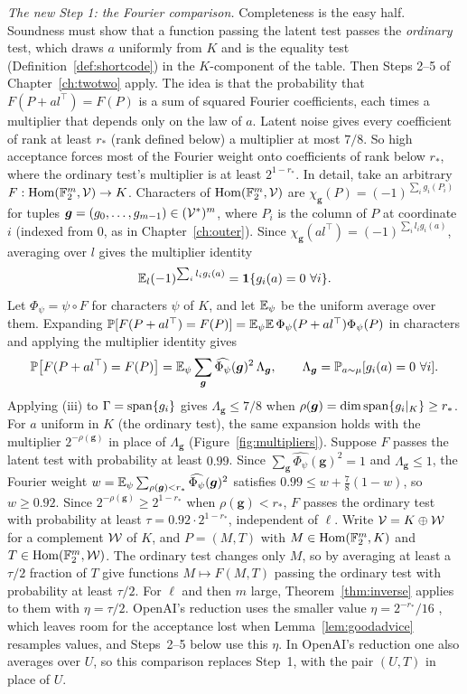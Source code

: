 \emph{The new Step 1: the Fourier comparison.}\label{nt:comparison} Completeness is the easy half. Soundness must show that a function passing the latent test passes the \emph{ordinary} test, which draws $a$ uniformly from $K$ and is the equality test (Definition~\ref{def:shortcode}) in the $K$-component of the table. Then Steps 2--5 of Chapter~\ref{ch:twotwo} apply. The idea is that the probability that $F(P+al^\top)=F(P)$ is a sum of squared Fourier coefficients, each times a multiplier that depends only on the law of $a$. Latent noise gives every coefficient of rank at least $r_*$ (rank defined below) a multiplier at most $7/8$. So high acceptance forces most of the Fourier weight onto coefficients of rank below $r_*$, where the ordinary test's multiplier is at least $2^{1-r_*}$. In detail, take an arbitrary $F:\operatorname{Hom}(\mathbb{F}_2^m,\mathcal{V})\to K$. Characters of $\operatorname{Hom}(\mathbb{F}_2^m,\mathcal{V})$ are $\chi_{\boldsymbol g}(P)=(-1)^{\sum_ig_i(P_i)}$ for tuples $\boldsymbol g=(g_0,\dots,g_{m-1})\in(\mathcal{V}^*)^m$, where $P_i$ is the column of $P$ at coordinate $i$ (indexed from $0$, as in Chapter~\ref{ch:outer}). Since $\chi_{\boldsymbol g}(al^\top)=(-1)^{\sum_il_ig_i(a)}$, averaging over $l$ gives the multiplier identity
\[
\E_l(-1)^{\sum_il_ig_i(a)}=\ind\{g_i(a)=0\ \forall i\}.
\]
Let $\Phi_\psi=\psi\circ F$ for characters $\psi$ of $K$, and let $\mathbb{E}_\psi$ be the uniform average over them. Expanding $\mathbb{P}[F(P+al^\top)=F(P)]=\mathbb{E}_\psi\mathbb{E}\,\Phi_\psi(P+al^\top)\Phi_\psi(P)$ in characters and applying the multiplier identity gives
\[
\mathbb{P}\bigl[F(P+al^\top)=F(P)\bigr]=\mathbb{E}_\psi\sum_{\boldsymbol g}\widehat{\Phi_\psi}(\boldsymbol g)^2\,\Lambda_{\boldsymbol g},\qquad \Lambda_{\boldsymbol g}=\mathbb{P}_{a\sim\mu}[g_i(a)=0\ \forall i].
\]
Applying (iii) to $\Gamma=\operatorname{span}\{g_i\}$ gives $\Lambda_{\boldsymbol g}\le7/8$ when $\rho(\boldsymbol g)=\dim\operatorname{span}\{g_i|_K\}\ge r_*$. For $a$ uniform in $K$ (the ordinary test), the same expansion holds with the multiplier $2^{-\rho(\boldsymbol g)}$ in place of $\Lambda_{\boldsymbol g}$ (Figure~\ref{fig:multipliers}). Suppose $F$ passes the latent test with probability at least $0.99$. Since $\sum_{\boldsymbol g}\widehat{\Phi_\psi}(\boldsymbol g)^2=1$ and $\Lambda_{\boldsymbol g}\le1$, the Fourier weight $w=\mathbb{E}_\psi\sum_{\rho(\boldsymbol g)<r_*}\widehat{\Phi_\psi}(\boldsymbol g)^2$ satisfies $0.99\le w+\tfrac78(1-w)$, so $w\ge0.92$. Since $2^{-\rho(\boldsymbol g)}\ge2^{1-r_*}$ when $\rho(\boldsymbol g)<r_*$, $F$ passes the ordinary test with probability at least $\tau=0.92\cdot2^{1-r_*}$, independent of $\ell$. Write $\mathcal{V}=K\oplus\mathcal{W}$ for a complement $\mathcal{W}$ of $K$, and $P=(M,T)$ with $M\in\operatorname{Hom}(\mathbb{F}_2^m,K)$ and $T\in\operatorname{Hom}(\mathbb{F}_2^m,\mathcal{W})$. The ordinary test changes only $M$, so by averaging at least a $\tau/2$ fraction of $T$ give functions $M\mapsto F(M,T)$ passing the ordinary test with probability at least $\tau/2$. For $\ell$ and then $m$ large, Theorem~\ref{thm:inverse} applies to them with $\eta=\tau/2$. OpenAI's reduction uses the smaller value $\eta=2^{-r_*}/16$ \cite[Equation~(5.4)]{OAI}, which leaves room for the acceptance lost when Lemma~\ref{lem:goodadvice} resamples values, and Steps~2--5 below use this $\eta$. In OpenAI's reduction one also averages over $U$, so this comparison replaces Step~1, with the pair $(U,T)$ in place of $U$.

